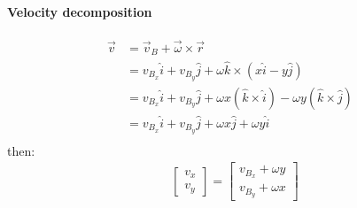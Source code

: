 \documentclass[12pt]{article}
\begin{document}
            \paragraph{Velocity decomposition}
            \begin{equation}
                \begin{aligned}
                    \vec{v} & = \vec{v}_B + \vec{\omega} \times \vec{r} \\
                    & = v_{B_x} \hat{i} + v_{B_y} \hat{j} + \omega \hat{k} \times (x \hat{i} - y \hat{j}) \\
                    & = v_{B_x} \hat{i} + v_{B_y} \hat{j} + \omega x (\hat{k} \times \hat{i}) - \omega y (\hat{k} \times \hat{j}) \\
                    & = v_{B_x} \hat{i} + v_{B_y} \hat{j} + \omega x \hat{j} + \omega y \hat{i} \\
                \end{aligned}
            \end{equation}
            then:
            \begin{equation}
                \begin{aligned}
                    & \begin{bmatrix} v_{x} \\ v_{y} \end{bmatrix}
                    = 
                    \begin{bmatrix} v_{B_x} + \omega y \\ v_{B_y} + \omega x \end{bmatrix} \\
                \end{aligned}
            \end{equation}
\end{document}
